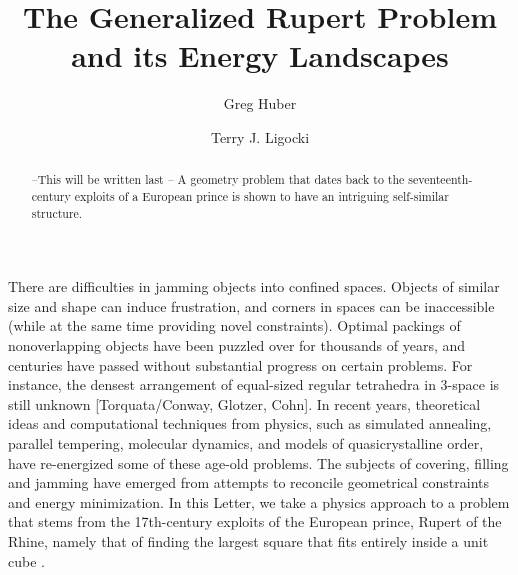 \documentclass[superscriptaddress,reprint,amsmath,amssymb,aps]{revtex4-1}
\begin{document}

\title{The Generalized Rupert Problem and its Energy Landscapes}


\author{Greg Huber}

\author{Terry J. Ligocki}



\begin{abstract}
--This will be written last --
A geometry problem that dates back to the seventeenth-century exploits
of a European prince is shown to have an intriguing self-similar structure.


\end{abstract}
\maketitle


There are difficulties in jamming objects into confined spaces.  Objects of similar size and shape can induce frustration, and corners in spaces can be inaccessible (while at the same time providing novel constraints).  Optimal packings of nonoverlapping objects have been puzzled over for thousands of years, and centuries have passed without substantial progress on certain problems. For instance, the densest arrangement of equal-sized regular tetrahedra in 3-space is still unknown [Torquata/Conway, Glotzer, Cohn].  In recent years, theoretical ideas and computational techniques from physics, such as simulated annealing, parallel tempering, molecular dynamics\cite{glotz1,glotz2}, and models of quasicrystalline order\cite{??kohn1}, have re-energized some of these age-old problems. The subjects of covering, filling and jamming have emerged from attempts to reconcile geometrical constraints and energy minimization. In this Letter, we take a physics approach to a problem that stems from the 17th-century exploits of the European prince, Rupert of the Rhine, namely that of finding the largest square that fits entirely inside a unit cube \cite{rupert-hist1}.
\end{document}
